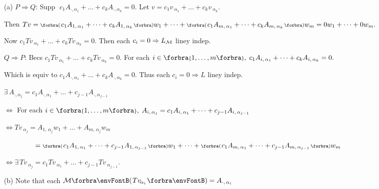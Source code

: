 (a) $P\Rightarrow Q:$\,\;Supp $\;c_1A_{\cdot,{\alpha_1}}+\dots+c_kA_{\cdot,{\alpha_k}}=0.$ \;Let $v=c_1v_{\:\!\!\alpha_1}+\dots+c_kv_{\:\!\!\alpha_k}.$\par\quad\Ha
{}Then $Tv=\BigPar{c_1A_{1,\,{\alpha_1}}+\dots+c_kA_{1,\,{\alpha_k}}}w_1+\dots+\BigPar{c_1A_{m,\,{\alpha_1}}+\dots+c_kA_{m,\,{\alpha_k}}}w_m=0w_1+\dots+0w_m.$\par\quad\Ha
{}Now $c_1Tv_{\:\!\!\alpha_1}+\dots+c_kTv_{\:\!\!\alpha_k}=0.$ Then each $c_i=0\Rightarrow L_{\mathcal{M}}$ liney indep.\vspace{4pt}\par\quad\Ha
$Q\Rightarrow P:$\,\;Becs $c_1Tv_{\:\!\!\alpha_1}+\dots+c_kTv_{\:\!\!\alpha_k}=0.$ For each $i\in\Bra{1,\dots,m},\;c_1A_{i,\,{\alpha_1}}+\dots+c_kA_{i,\,{\alpha_k}}=0.$\par\quad\Ha
{}Which is equiv to $c_1A_{\cdot,{\alpha_1}}+\dots+c_kA_{\cdot,{\alpha_k}}=0.$ \;Thus each $c_i=0\Rightarrow L$ liney indep.\par\vspace{4pt}\quad\Ha
\Or\;$\exists\,A_{\cdot,{\alpha_j}}=c_1A_{\cdot,{\alpha_1}}+\dots+c_{j-1}A_{\cdot,{\alpha_{j-1}}}$\par\quad\Ha
\Blind{\Or\;}$\Longleftrightarrow$ For each $i\in\Bra{1,\dots,m},\;A_{i,\,{\alpha_j}}=c_1A_{i,\,{\alpha_1}}+\dots+c_{j-1}A_{i,\,{\alpha_{j-1}}}$\par\quad\Ha
\Blind{\Or\;}$\Longleftrightarrow Tv_{\:\!\!\alpha_j}=A_{1,\,{\alpha_j}}w_1+\dots+A_{m,\,{\alpha_j}}w_m$\par\vspace{2pt}\quad\Ha
\Blind{\Or\;}$\Blind{\Longleftrightarrow Tv_{\:\!\!\alpha_j}}=\BigPar{c_1A_{1,\,{\alpha_1}}+\dots+c_{j-1}A_{1,\,{\alpha_{j-1}}}}w_1+\dots+\BigPar{c_1A_{m,\,{\alpha_1}}+\dots+c_{j-1}A_{m,\,{\alpha_{j-1}}}}w_m$\par\vspace{2pt}\quad\Ha
\Blind{\Or\;}$\Longleftrightarrow\exists\,Tv_{\:\!\!\alpha_j}=c_1Tv_{\:\!\!\alpha_1}+\dots+c_{j-1}Tv_{\:\!\!\alpha_{j-1}}.$\par\vspace{6pt}\quad
(b) Note that each $\Mt{Tv_{\:\!\!\alpha_i}}=A_{\cdot,\,\alpha_i}$\par\quad\Hb
